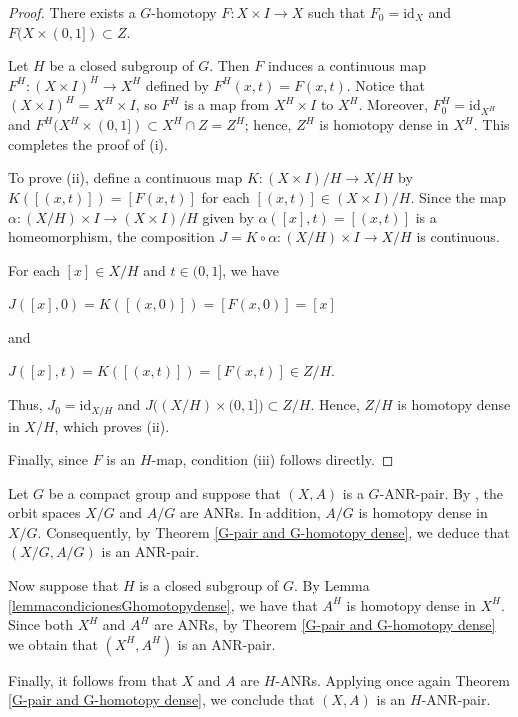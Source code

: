 \documentclass[12pt]{amsart}
\theoremstyle{definition}
\begin{document}
	\begin{proof}
		There exists a $G$-homotopy $F: X\times I\rightarrow X$ such that $F_0=\mbox{id}_X$ and $F(X\times (0,1])\subset Z$. 
		
		Let $H$ be a closed subgroup of $G$. Then $F$ induces a continuous map $F^H: (X\times I)^H\rightarrow X^H$ defined by $F^H(x,t)=F(x,t)$. Notice that $(X\times I)^H=X^H\times I$, so $F^H$ is a map from $X^H\times I$ to $X^H$. Moreover, $F^H_0=\mbox{id}_{X^H}$ and $F^H(X^H\times (0,1])\subset X^H\cap Z=Z^H$; hence, $Z^H$ is homotopy dense in $X^H$. This completes the proof of (i).
		
		To prove (ii), define a continuous map  $K: (X\times I)/H\rightarrow X/H$ by $K([(x,t)])=[F(x,t)]$ for each $[(x,t)]\in (X\times I)/H$. Since the map $\alpha: (X/H)\times I\rightarrow (X\times I)/H$ given by $\alpha([x],t)=[(x,t)]$ is a homeomorphism, the composition $J=K\circ \alpha: (X/H)\times I\rightarrow X/H$ is continuous. 
		
		For each $[x]\in X/H$ and $t\in (0,1]$, we have
		
		\begin{center}
			$J([x],0)=K([(x,0)])=[F(x,0)]=[x]$
		\end{center}
		and
		\begin{center}
			$J([x],t)=K([(x,t)])=[F(x,t)]\in Z/H$.
		\end{center}
		Thus, $J_0=\mbox{id}_{X/H}$ and $J\big((X/H)\times (0,1]\big)\subset Z/H$. Hence,  $Z/H$ is homotopy dense in $X/H$, which proves (ii).
		
		Finally, since $F$ is an $H$-map, condition (iii) follows directly.
	\end{proof}
	
	Let $G$ be a compact group and suppose that $(X,A)$ is a $G$-ANR-pair. By \cite[Theorem 1.1]{A5}, the orbit spaces $X/G$ and $A/G$ are ANRs. In addition, $A/G$ is homotopy dense in $X/G$. Consequently, by Theorem \ref{G-pair and G-homotopy dense}, we deduce that $(X/G,A/G)$ is an ANR-pair.
	
	Now suppose that $H$ is a closed subgroup of $G$. By Lemma \ref{lemmacondicionesGhomotopydense}, we have that $A^H$ is homotopy dense in $X^H$. Since both $X^H$ and $A^H$ are ANRs, by Theorem \ref{G-pair and G-homotopy dense} we obtain that $(X^H, A^H)$ is an ANR-pair.
	
	Finally, it follows from \cite[Corollary 6.4]{AAM} that $X$ and $A$ are $H$-ANRs. Applying once again Theorem \ref{G-pair and G-homotopy dense}, we conclude that $(X, A)$ is an $H$-ANR-pair.
	
\end{document}
